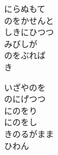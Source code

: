\documentclass[10pt,b5j]{tarticle} %
\begin{document}
\begin{enumerate}
\begin{minipage}[c]{\blocksize}
        \vspace{\linespace}
        \item
        にらぬもて\\
        のをかせんと\\
        しきにひつつ\\
        みびしが\\
        のをぶれば\\
        き
        
        \vspace{\linespace}
        \item
        いざやのを\\
        のにげつつ\\
        にのをり\\
        にのをし\\
        きのるがまま\\
        ひわん
    
    \end{minipage}
\end{enumerate} %
\end{document}
